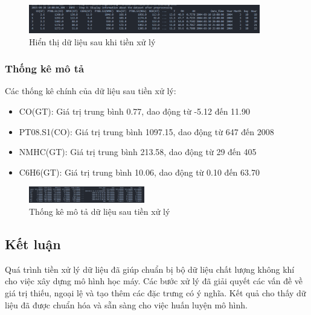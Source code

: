 \begin{figure}[htbp]
    \centering
    \includegraphics[width=0.9\textwidth]{images/processed_data_preview.png}
    \vspace{0.5cm}
    \caption{Hiển thị dữ liệu sau khi tiền xử lý}
    \label{fig:processed_data_preview}
\end{figure}

\subsubsection{Thống kê mô tả}
\hspace{0.5cm}Các thống kê chính của dữ liệu sau tiền xử lý:
\begin{itemize}
    \item CO(GT): Giá trị trung bình 0.77, dao động từ -5.12 đến 11.90
    \item PT08.S1(CO): Giá trị trung bình 1097.15, dao động từ 647 đến 2008
    \item NMHC(GT): Giá trị trung bình 213.58, dao động từ 29 đến 405
    \item C6H6(GT): Giá trị trung bình 10.06, dao động từ 0.10 đến 63.70
\end{itemize}

\begin{figure}[htbp]
    \centering
    \includegraphics[width=0.45\textwidth]{images/processed_data_statistics.png}
    \vspace{0.5cm}
    \caption{Thống kê mô tả dữ liệu sau tiền xử lý}
    \label{fig:processed_data_statistics}
\end{figure}

\subsection{Kết luận}
\hspace{0.5cm}Quá trình tiền xử lý dữ liệu đã giúp chuẩn bị bộ dữ liệu chất lượng không khí cho việc xây dựng mô hình học máy. Các bước xử lý đã giải quyết các vấn đề về giá trị thiếu, ngoại lệ và tạo thêm các đặc trưng có ý nghĩa. Kết quả cho thấy dữ liệu đã được chuẩn hóa và sẵn sàng cho việc huấn luyện mô hình.